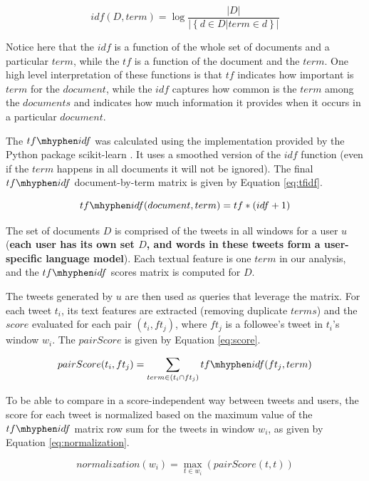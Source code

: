 \begin{equation}
idf(D,term) = \log \frac{|D|}{|\left\{d \in D | term \in d\right\}|}
\label{eq:idf}
\end{equation}

Notice here that the $idf$ is a function of the whole set of documents and a particular $term$, while the $tf$ is a function of the document and the $term$.
One high level interpretation of these functions is that $tf$ indicates how important is $term$ for the $document$, while the $idf$ captures how common is the $term$ among the $documents$ and indicates how much information it provides when it occurs in a particular $document$.

The $tf\mhyphen idf$ was calculated using the implementation provided by the Python package scikit-learn \cite{scikit-learn}. It uses a smoothed version of the $idf$ function (even if the $term$ happens in all documents it will not be ignored). The final $tf\mhyphen idf$ document-by-term matrix is given by Equation \ref{eq:tfidf}.

\begin{equation}
tf\mhyphen idf(document,term) = tf*(idf + 1)
\label{eq:tfidf}
\end{equation}

The set of documents $D$ is comprised of the tweets in all windows for a user $u$ (\textbf{each user has its own set $D$, and words in these tweets form a user-specific language model}). Each textual feature is one $term$ in our analysis, and the $tf\mhyphen idf$ scores matrix is computed for $D$. 

The tweets generated by $u$ are then used as queries that leverage the matrix.  For each tweet $t_i$, its text features are extracted (removing duplicate $terms$) and the $score$ evaluated for each pair $(t_i,ft_j)$, where $ft_j$ is a followee's tweet in $t_i$'s window $w_i$. The $pairScore$ is given by Equation \ref{eq:score}.

\begin{equation}
pairScore(t_i,ft_j) = \sum_{term \in \left(t_i \cap ft_j\right)}{tf\mhyphen idf(ft_j,term)}
\label{eq:score}
\end{equation}

To be able to compare in a score-independent way between tweets and users, the score for each tweet is normalized based on the maximum value of the $tf\mhyphen idf$ matrix row sum for the tweets in window $w_i$, as given by Equation \ref{eq:normalization}.

\begin{equation}
normalization(w_i) = \max_{t \in w_i}(pairScore(t,t))
\label{eq:normalization}
\end{equation}

